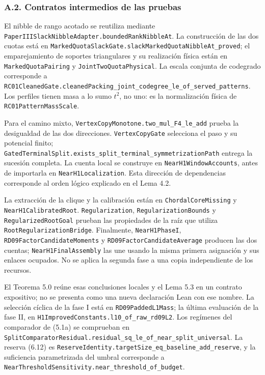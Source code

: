 \documentclass[spanish,11pt,a4paper]{article}
\begin{document}
\subsubsection{A.2. Contratos intermedios de las pruebas}\label{a.2.-contratos-intermedios-de-las-pruebas}

El nibble de rango acotado se reutiliza mediante \nolinkurl{PaperIIISlackNibbleAdapter.boundedRankNibbleAt}. La construcción de las dos cuotas está en \nolinkurl{MarkedQuotaSlackGate.slackMarkedQuotaNibbleAt_proved}; el emparejamiento de soportes triangulares y su realización física están en \nolinkurl{MarkedQuotaPairing} y \nolinkurl{JointTwoQuotaPhysical}. La escala conjunta de codegrado corresponde a \nolinkurl{RC01CleanedGate.cleanedPacking_joint_codegree_le_of_served_patterns}. Los perfiles tienen masa a lo sumo \(t^2\), no uno: es la normalización física de \nolinkurl{RC01PatternMassScale}.

Para el camino mixto, \nolinkurl{VertexCopyMonotone.two_mul_F4_le_add} prueba la desigualdad de las dos direcciones. \nolinkurl{VertexCopyGate} selecciona el paso y su potencial finito; \nolinkurl{GatedTerminalSplit.exists_split_terminal_symmetrizationPath} entrega la sucesión completa. La cuenta local se construye en \nolinkurl{NearH1WindowAccounts}, antes de importarla en \nolinkurl{NearH1Localization}. Esta dirección de dependencias corresponde al orden lógico explicado en el Lema 4.2.

La extracción de la clique y la calibración están en \nolinkurl{ChordalCoreMissing} y \nolinkurl{NearH1CalibratedRoot}. \nolinkurl{Regularization}, \nolinkurl{RegularizationBounds} y \nolinkurl{RegularizedRootGoal} prueban las propiedades de la raíz que utiliza \nolinkurl{RootRegularizationBridge}. Finalmente, \nolinkurl{NearH1PhaseI}, \nolinkurl{RD09FactorCandidateMoments} y \nolinkurl{RD09FactorCandidateAverage} producen las dos cuentas; \nolinkurl{NearH1FinalAssembly} las une usando la misma primera asignación y sus enlaces ocupados. No se aplica la segunda fase a una copia independiente de los recursos.

El Teorema 5.0 reúne esas conclusiones locales y el Lema 5.3 en un contrato expositivo; no se presenta como una nueva declaración Lean con ese nombre. La selección cíclica de la fase I está en \nolinkurl{RD09PaddedL1Mass}; la última evaluación de la fase II, en \nolinkurl{H1ImprovedConstants.l10_of_raw_rd09L2}. Los regímenes del comparador de (5.1a) se comprueban en \nolinkurl{SplitComparatorResidual.residual_sq_le_of_near_split_universal}. La reserva (6.12) es \nolinkurl{ReserveIdentity.targetSize_eq_baseline_add_reserve}, y la suficiencia parametrizada del umbral corresponde a \nolinkurl{NearThresholdSensitivity.near_threshold_of_budget}.
\end{document}
